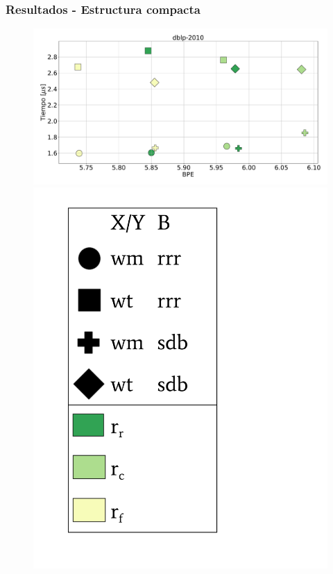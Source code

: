 \begin{frame}
\frametitle{Resultados - Estructura compacta}

\begin{figure}
	\centering
	
    	\begin{minipage}{1\textwidth}
    		\centering
    		\begin{minipage}{0.8\textwidth}
    			\centering
    			\includegraphics[width=1\linewidth]{../img/sdsl/secuencialBig/dblp-2010.pdf}
    		\end{minipage}
    		\begin{minipage}{0.15\textwidth}
    			\centering
    			\includegraphics[scale=.15, clip, trim=70 0 0 0]{../img/sdsl/label.pdf}
    		\end{minipage}	
    	\end{minipage}


\end{figure}
\end{frame}
